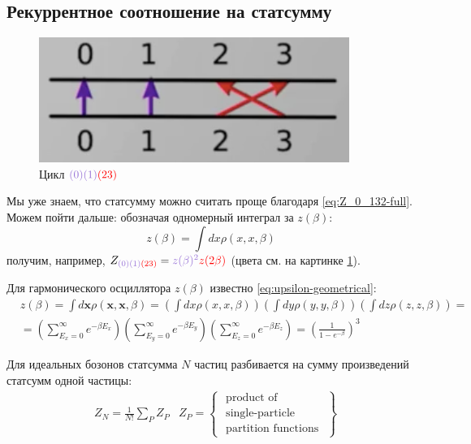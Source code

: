 \subsection{Рекуррентное соотношение на статсумму}
\begin{figure}
    \label{fig:cycle-0-1-23}
    \includegraphics[width=\linewidth]{fig/cycle-0-1-23}
    \caption{Цикл ${\color{purple} (0)(1)} {\color{red} (23)}$}
\end{figure}
Мы уже знаем, что статсумму можно считать проще благодаря \eqref{eq:Z_0_132-full}.
Можем пойти дальше: обозначая одномерный интеграл за $z(\beta)$:
\begin{equation}
    \label{eq:z_beta-definition}
    z (\beta) = \int dx \rho(x, x, \beta)
\end{equation}
получим, например, $Z_{{\color{purple} (0)(1)} {\color{red} (23)}} = {\color{purple} z(\beta)^2} {\color{red} z(2\beta)}$ (цвета см. на картинке \ref{fig:cycle-0-1-23}).

Для гармонического осциллятора $z(\beta)$ известно \eqref{eq:upsilon-geometrical}:
\begin{align}
    \label{eq:z_small-3d-hamonic}
    & z(\beta) =\int d \mathbf{x} \rho(\mathbf{x}, \mathbf{x}, \beta) 
    = \left(\int d x \rho(x, x, \beta)\right) \left(\int d y \rho(y, y, \beta)\right) \left(\int d z \rho(z, z, \beta)\right) = \\
    & = \left(\sum_{E_{x}=0}^{\infty} e^{-\beta E_{x}}\right)\left(\sum_{E_{y}=0}^{\infty} e^{-\beta E_{y}}\right) \left(\sum_{E_{z}=0}^{\infty} e^{-\beta E_{z}}\right) 
    = \left(\frac{1}{1-e^{-\beta}}\right)^{3}
\end{align}

Для идеальных бозонов статсумма $N$ частиц разбивается на сумму произведений статсумм одной частицы:
\begin{align}
    \label{eq:Z-N_particle-ideal-bosons-strict}
    & Z_{N} = \frac{1}{N !} \sum_{P} Z_{P} & Z_{P} = \left\{\begin{array}{c}\text { product of } \\ \text { single-particle } \\ \text { partition functions }\end{array}\right\}
\end{align}

